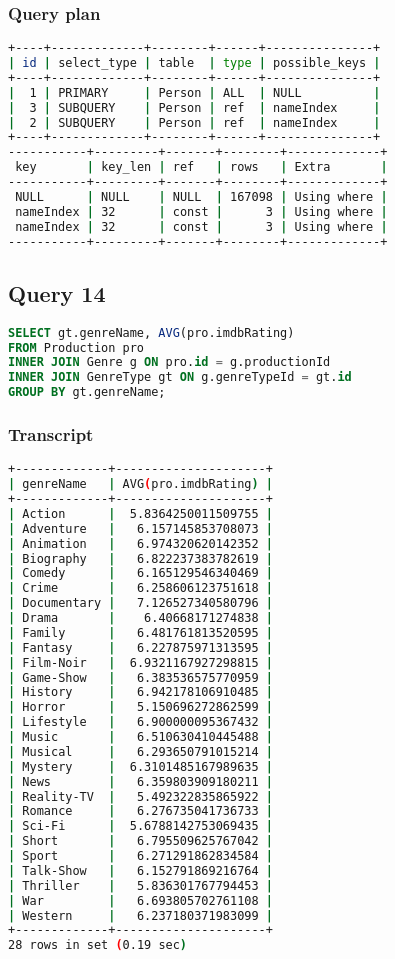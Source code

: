 \subsubsection{Query plan}
\begin{lstlisting}[language=bash]
+----+-------------+--------+------+---------------+
| id | select_type | table  | type | possible_keys |
+----+-------------+--------+------+---------------+
|  1 | PRIMARY     | Person | ALL  | NULL          |
|  3 | SUBQUERY    | Person | ref  | nameIndex     |
|  2 | SUBQUERY    | Person | ref  | nameIndex     |
+----+-------------+--------+------+---------------+
-----------+---------+-------+--------+-------------+
 key       | key_len | ref   | rows   | Extra       |
-----------+---------+-------+--------+-------------+
 NULL      | NULL    | NULL  | 167098 | Using where |
 nameIndex | 32      | const |      3 | Using where |
 nameIndex | 32      | const |      3 | Using where |
-----------+---------+-------+--------+-------------+
\end{lstlisting}


\bigskip
\subsection{Query 14}
\begin{lstlisting}[language=sql]
SELECT gt.genreName, AVG(pro.imdbRating)
FROM Production pro
INNER JOIN Genre g ON pro.id = g.productionId
INNER JOIN GenreType gt ON g.genreTypeId = gt.id
GROUP BY gt.genreName;
\end{lstlisting}

\subsubsection{Transcript}
\begin{lstlisting}[language=bash]
+-------------+---------------------+
| genreName   | AVG(pro.imdbRating) |
+-------------+---------------------+
| Action      |  5.8364250011509755 |
| Adventure   |   6.157145853708073 |
| Animation   |   6.974320620142352 |
| Biography   |   6.822237383782619 |
| Comedy      |   6.165129546340469 |
| Crime       |   6.258606123751618 |
| Documentary |   7.126527340580796 |
| Drama       |    6.40668171274838 |
| Family      |   6.481761813520595 |
| Fantasy     |   6.227875971313595 |
| Film-Noir   |  6.9321167927298815 |
| Game-Show   |   6.383536575770959 |
| History     |   6.942178106910485 |
| Horror      |   5.150696272862599 |
| Lifestyle   |   6.900000095367432 |
| Music       |   6.510630410445488 |
| Musical     |   6.293650791015214 |
| Mystery     |  6.3101485167989635 |
| News        |   6.359803909180211 |
| Reality-TV  |   5.492322835865922 |
| Romance     |   6.276735041736733 |
| Sci-Fi      |  5.6788142753069435 |
| Short       |   6.795509625767042 |
| Sport       |   6.271291862834584 |
| Talk-Show   |   6.152791869216764 |
| Thriller    |   5.836301767794453 |
| War         |   6.693805702761108 |
| Western     |   6.237180371983099 |
+-------------+---------------------+
28 rows in set (0.19 sec)
\end{lstlisting}

